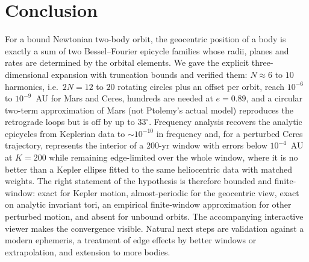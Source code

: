 \section{Conclusion}
\label{sec:conclusion}

For a bound Newtonian two-body orbit, the geocentric position of a body
is exactly a sum of two Bessel--Fourier epicycle families whose radii,
planes and rates are determined by the orbital elements. We gave the explicit
three-dimensional expansion with truncation bounds and verified them: $N\approx6$ to $10$ harmonics, i.e.\ $2N=12$ to $20$ rotating circles
plus an offset per orbit, reach $10^{-6}$ to $10^{-9}$~AU for
Mars and Ceres, hundreds are needed at $e=0.89$, and a circular two-term approximation
of Mars (not Ptolemy's actual model) reproduces the retrograde loops but is off by up to
$33^\circ$. Frequency analysis recovers the analytic epicycles from
Keplerian data to $\sim10^{-10}$ in frequency and, for a perturbed Ceres
trajectory, represents the interior of a $200$-yr window with errors below
$10^{-4}$~AU at $K=200$ while remaining edge-limited over the whole window,
where it is no better than a Kepler ellipse fitted to the same heliocentric data with matched weights. The right
statement of the hypothesis is therefore bounded and finite-window:
exact for Kepler motion, almost-periodic for the geocentric view,
exact on analytic invariant tori, an empirical finite-window approximation for
other perturbed motion, and absent for unbound orbits. The accompanying interactive viewer makes the
convergence visible. Natural next steps are validation against a modern
ephemeris, a treatment of edge effects by better windows or extrapolation, and
extension to more bodies.
